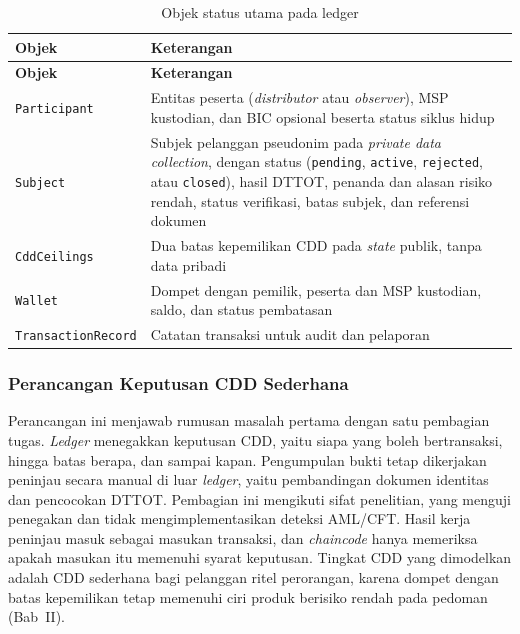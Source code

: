 \begingroup
\renewcommand{\arraystretch}{1.3}
\begin{longtable}{>{\RaggedRight\arraybackslash}p{4.4cm}
                  >{\RaggedRight\arraybackslash}p{8.5cm}}
	\caption{Objek status utama pada ledger}\label{tab:model-data}                        \\
	\toprule
	\textbf{Objek}             & \textbf{Keterangan}                                      \\
	\midrule
	\endfirsthead
	\toprule
	\textbf{Objek}             & \textbf{Keterangan}                                      \\
	\midrule
	\endhead
	\bottomrule
	\endlastfoot
	\texttt{Participant}       & Entitas peserta (\textit{distributor} atau \textit{observer}), MSP kustodian,
	dan BIC opsional beserta status siklus hidup                                           \\
\texttt{Subject}           & Subjek pelanggan pseudonim pada \textit{private data collection}, dengan status (\texttt{pending}, \texttt{active}, \texttt{rejected}, atau \texttt{closed}), hasil DTTOT, penanda dan alasan risiko rendah, status verifikasi, batas subjek, dan referensi dokumen \\
\texttt{CddCeilings}       & Dua batas kepemilikan CDD pada \textit{state} publik, tanpa data pribadi \\
\texttt{Wallet}            & Dompet dengan pemilik, peserta dan MSP kustodian, saldo, dan status pembatasan \\
\texttt{Transaction\allowbreak Record} & Catatan transaksi untuk audit dan pelaporan  \\
\end{longtable}
\endgroup

\subsubsection{Perancangan Keputusan CDD Sederhana}

Perancangan ini menjawab rumusan masalah pertama dengan satu pembagian tugas. \textit{Ledger} menegakkan keputusan CDD, yaitu siapa yang boleh bertransaksi, hingga batas berapa, dan sampai kapan. Pengumpulan bukti tetap dikerjakan peninjau secara manual di luar \textit{ledger}, yaitu pembandingan dokumen identitas dan pencocokan DTTOT. Pembagian ini mengikuti sifat penelitian, yang menguji penegakan dan tidak mengimplementasikan deteksi AML/CFT. Hasil kerja peninjau masuk sebagai masukan transaksi, dan \textit{chaincode} hanya memeriksa apakah masukan itu memenuhi syarat keputusan. Tingkat CDD yang dimodelkan adalah CDD sederhana bagi pelanggan ritel perorangan, karena dompet dengan batas kepemilikan tetap memenuhi ciri produk berisiko rendah pada pedoman (Bab~II).


